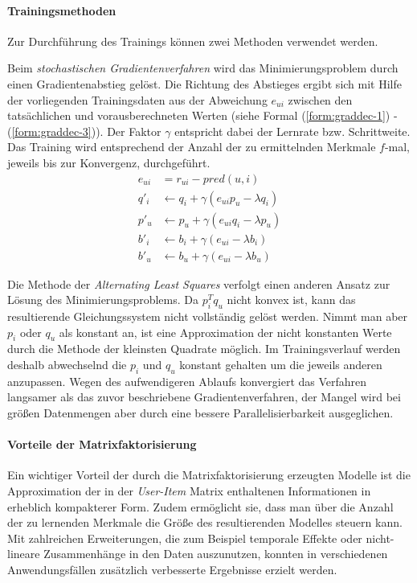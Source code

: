 \paragraph{Trainingsmethoden} Zur Durchführung des Trainings können zwei Methoden verwendet werden.

Beim \textit{stochastischen Gradientenverfahren} \citep{funk2006} wird das Minimierungsproblem durch einen Gradientenabstieg gelöst. Die Richtung des Abstieges  ergibt sich mit Hilfe der vorliegenden Trainingsdaten aus der Abweichung $e_{ui}$ zwischen den tatsächlichen und vorausberechneten Werten (siehe Formal (\ref{form:graddec-1}) - (\ref{form:graddec-3})). Der Faktor $\gamma$ entspricht dabei der Lernrate bzw. Schrittweite. Das Training wird entsprechend der Anzahl der zu ermittelnden Merkmale  $f$-mal, jeweils bis zur Konvergenz, durchgeführt. \citep{funk2006,Langford09,hb_05}
\begin{align}
e_{ui} & =  r_{ui} - pred(u,i) \label{form:graddec-1} \\
q'_i & \gets q_i + \gamma (e_{ui} p_u - \lambda q_i ) \label{form:graddec-2} \\
p'_u & \gets p_u + \gamma (e_{ui} q_i - \lambda p_u) \\
b'_i & \gets b_i + \gamma (e_{ui} - \lambda b_i) \\
b'_u & \gets b_u + \gamma (e_{ui} - \lambda b_u) \label{form:graddec-3}
\end{align}

Die Methode der \textit{Alternating Least Squares} \citep{Bell:2007:SCF:1441428.1442050} verfolgt einen anderen Ansatz zur Lösung des Minimierungsproblems. Da $ p_i^T q_u $ nicht konvex ist, kann das resultierende Gleichungssystem nicht vollständig gelöst werden. Nimmt man aber $p_i$ oder $q_u$ als konstant an, ist eine Approximation der nicht konstanten Werte durch die Methode der kleinsten Quadrate möglich. Im Trainingsverlauf werden deshalb abwechselnd die $p_i$ und $q_u$ konstant gehalten um die jeweils anderen anzupassen. Wegen des aufwendigeren Ablaufs konvergiert das Verfahren langsamer als das zuvor beschriebene Gradientenverfahren, der Mangel wird bei größen Datenmengen aber durch eine bessere Parallelisierbarkeit ausgeglichen. \citep{Bell:2007:SCF:1441428.1442050, hb_05}  

\paragraph{Vorteile der Matrixfaktorisierung} Ein wichtiger Vorteil der durch die Matrixfaktorisierung erzeugten Modelle ist die Approximation der in der \textit{User-Item} Matrix enthaltenen Informationen in erheblich kompakterer Form. Zudem ermöglicht sie, dass man über die Anzahl der zu lernenden Merkmale die Größe des resultierenden Modelles steuern kann. Mit zahlreichen Erweiterungen, die zum Beispiel temporale Effekte oder nicht-lineare Zusammenhänge in den Daten auszunutzen, konnten in verschiedenen Anwendungsfällen zusätzlich verbesserte Ergebnisse erzielt werden. \citep{hb_05,Vozalis:2007:USD:1243505.1243639}

